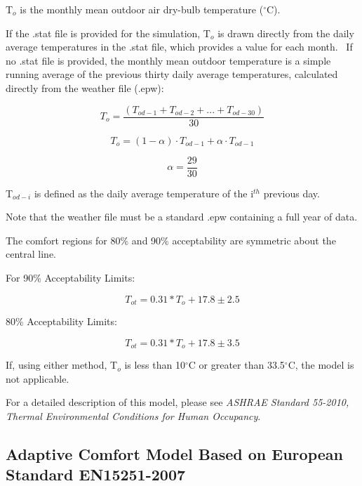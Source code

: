 T\(_{o}\) is the monthly mean outdoor air dry-bulb temperature (\(^{\circ}\)C).

If the .stat file is provided for the simulation, T\(_{o}\) is drawn directly from the daily average temperatures in the .stat file, which provides a value for each month.~ If no .stat file is provided, the monthly mean outdoor temperature is a simple running average of the previous thirty daily average temperatures, calculated directly from the weather file (.epw):

\begin{equation}
{T_o} = \frac{{\left( {{T_{od - 1}} + {T_{od - 2}} + ... + {T_{od - 30}}} \right)}}{{30}}
\end{equation}

\begin{equation}
{T_o} = (1 - \alpha )\cdot {T_{od - 1}} + \alpha \cdot {T_{od - 1}}
\end{equation}

\begin{equation}
\alpha  = \frac{{29}}{{30}}
\end{equation}

T\(_{od-i}\) is defined as the daily average temperature of the i\(^{th}\) previous day.

Note that the weather file must be a standard .epw containing a full year of data.

The comfort regions for 80\% and 90\% acceptability are symmetric about the central line.

For 90\% Acceptability Limits:

\begin{equation}
T_{ot} = 0.31* T_{o} + 17.8 ± 2.5
\end{equation}

80\% Acceptability Limits:

\begin{equation}
T_{ot} = 0.31* T_{o} + 17.8 ± 3.5
\end{equation}

If, using either method, T\(_{o}\) is less than 10\(^{\circ}\)C or greater than 33.5\(^{\circ}\)C, the model is not applicable.

For a detailed description of this model, please see \emph{ASHRAE Standard 55-2010, Thermal Environmental Conditions for Human Occupancy}.

\subsection{Adaptive Comfort Model Based on European Standard EN15251-2007}\label{adaptive-comfort-model-based-on-european-standard-en15251-2007}

